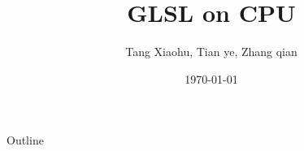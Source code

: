 \documentclass{beamer}
\title[]{GLSL on CPU}
\author{Tang Xiaohu, Tian ye, Zhang qian}
\date{\today}
\begin{document}
\begin{frame}
  \titlepage
\end{frame}

\begin{frame}{Outline}
 \tableofcontents
\end{frame}





% 

% 
\end{document}
